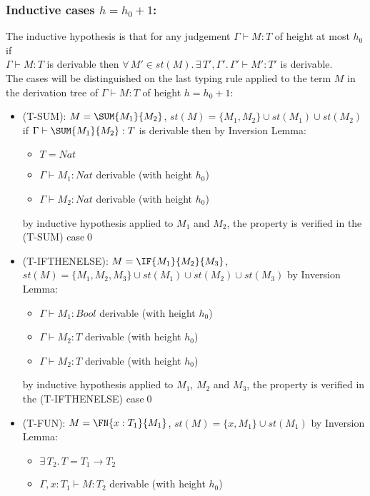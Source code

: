 \subsubsection*{Inductive cases $h = h_0 + 1$:}
The inductive hypothesis is that for any judgement $\Gamma \vdash M: T$
of height at most $h_0$ if\\ $\Gamma \vdash M: T$ is derivable then
$\forall\,M' \in st(M).\,\exists\,T', \Gamma'.\, \Gamma' \vdash M': T'$ is
derivable.\\
The cases will be distinguished on the last typing rule applied to the
term $M$ in the derivation tree of $\Gamma \vdash M: T$ of height $h = h_0 + 1$:
\begin{itemize}
	\item (T-SUM): $M = \SUM{M_1}{M_2}$, $st(M) = \{ M_1, M_2 \} \cup st(M_1) \cup st(M_2)$ if
	      $\Gamma \vdash \SUM{M_1}{M_2}: T$ is derivable then by Inversion Lemma:
	      \begin{itemize}
		      \item $T = Nat$
		      \item $\Gamma \vdash M_1: Nat$ derivable (with height $h_0$)
		      \item $\Gamma \vdash M_2: Nat$ derivable (with height $h_0$)
	      \end{itemize}
	      by inductive hypothesis applied to $M_1$ and $M_2$, the property is verified in the
	      (T-SUM) case\qed
	\item (T-IFTHENELSE): $M = \IF{M_1}{M_2}{M_3}$,\\
	      $st(M) = \{ M_1, M_2, M_3 \} \cup st(M_1) \cup st(M_2) \cup st(M_3)$
	      by Inversion Lemma:
	      \begin{itemize}
		      \item $\Gamma \vdash M_1: Bool$ derivable (with height $h_0$)
		      \item $\Gamma \vdash M_2: T$ derivable (with height $h_0$)
		      \item $\Gamma \vdash M_2: T$ derivable (with height $h_0$)
	      \end{itemize}
	      by inductive hypothesis applied to $M_1$, $M_2$ and $M_3$, the property is verified
	      in the (T-IFTHENELSE) case\qed
	\item (T-FUN): $M = \FN{x: T_1}{M_1}$, $st(M) = \{ x, M_1 \} \cup st(M_1)$
	      by Inversion Lemma:
	      \begin{itemize}
		      \item $\exists\, T_2.\,T = T_1 \to T_2$
		      \item $\Gamma, x: T_1 \vdash M: T_2$ derivable (with height $h_0$)

\end{itemize}
\end{itemize}
